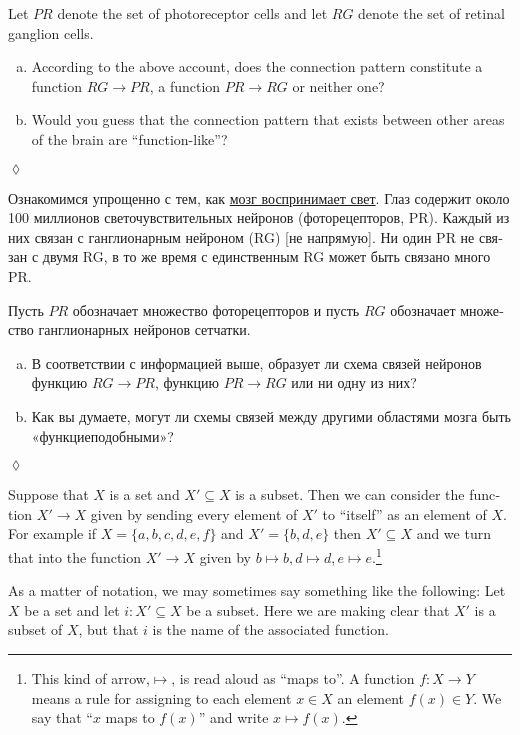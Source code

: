 \documentclass[a4paper]{book}
\def\to{\rightarrow}
\def\taking{\colon}
\def\ss{\subseteq}
\theoremstyle{myth}
\newtheorem{exampleENG}[envENG]{\begin{english}Example\end{english}}
\newtheorem{excENG}[envENG]{\begin{english}Exercise\end{english}}
\newenvironment{exerciseENG}{\begin{excENG}}{\hspace*{\fill}$\lozenge$\end{excENG}}
\newtheorem{excRUS}[envRUS]{\begin{russian}Упражнение\end{russian}}
\newenvironment{exerciseRUS}{\begin{excRUS}}{\hspace*{\fill}$\lozenge$\end{excRUS}}
\def\sexc{\begin{enumerate}[a.)]\setlength{\itemsep}{.1cm}\setlength{\parskip}{.1cm}\item}
\def\next{\item}
\def\endsexc{\end{enumerate}}
\begin{document}
\begin{english}
\begin{exerciseENG}
Let $PR$ denote the set of photoreceptor cells and let $RG$ denote the set of retinal ganglion cells. 
\sexc According to the above account, does the connection pattern constitute a function $RG\to PR$, a function $PR\to RG$ or neither one? 
\next Would you guess that the connection pattern that exists between other areas of the brain are “function-like”?
\endsexc
\end{exerciseENG}

\begin{exerciseRUS}
\begin{russian} 
Ознакомимся упрощенно с тем, как \href{https://ru.wikipedia.org/wiki/%D0%A1%D0%B5%D1%82%D1%87%D0%B0%D1%82%D0%BA%D0%B0}{\text мозг воспринимает свет}. Глаз содержит около 100 миллионов светочувствительных нейронов (фоторецепторов, PR). Каждый из них связан с ганглионарным нейроном (RG) [не напрямую]. Ни один PR не связан с двумя RG, в то же время с единственным RG может быть связано много PR.

Пусть $PR$ обозначает множество фоторецепторов и пусть $RG$ обозначает множество ганглионарных нейронов сетчатки. 
\sexc В соответствии с информацией выше, образует ли схема связей нейронов функцию $RG\to PR$, функцию $PR\to RG$ или ни одну из них? 
\next Как вы думаете, могут ли схемы связей между другими областями мозга быть «функциеподобными»? 
\endsexc 
\end{russian}
\end{exerciseRUS}

\begin{exampleENG}\label{ex:subset as function}
Suppose that $X$ is a set and $X'\ss X$ is a subset. Then we can consider the function $X'\to X$ given by sending every element of $X'$ to “itself” as an element of $X$. For example if $X=\{a,b,c,d,e,f\}$ and $X'=\{b,d,e\}$ then $X'\ss X$ and we turn that into the function $X'\to X$ given by $b\mapsto b, d\mapsto d, e\mapsto e$.\footnote{This kind of arrow,\;\;$\mapsto$\;\;, is read aloud as “maps to”. A function $f\taking X\to Y$ means a rule for assigning to each element $x\in X$ an element $f(x)\in Y$. We say that “$x$ maps to $f(x)$” and write $x\mapsto f(x)$.}

As a matter of notation, we may sometimes say something like the following: Let $X$ be a set and let $i\taking X'\ss X$ be a subset. Here we are making clear that $X'$ is a subset of $X$, but that $i$ is the name of the associated function.
\end{exampleENG}


\end{english}
\end{document}

